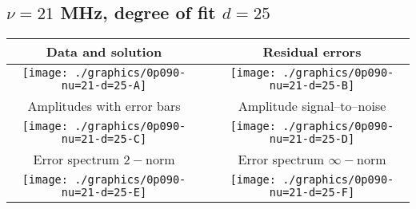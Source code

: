 

% 

\clearpage{}
\break{}

\subsection{$\nu = 21$ MHz, degree of fit $d = 25$}

\begin{table}[h]
    \begin{center}
        \begin{tabular}{ccc}
            Data and solution & \quad & Residual errors \\\hline
            \texttt{[image: ./graphics/0p090-nu=21-d=25-A]} &&
            \texttt{[image: ./graphics/0p090-nu=21-d=25-B]} \\[15pt]
            Amplitudes with error bars && Amplitude signal--to--noise \\\hline
            \texttt{[image: ./graphics/0p090-nu=21-d=25-C]} &&
            \texttt{[image: ./graphics/0p090-nu=21-d=25-D]} \\[15pt]
            Error spectrum $2-$norm && Error spectrum $\infty-$norm \\\hline
            \texttt{[image: ./graphics/0p090-nu=21-d=25-E]} &&
            \texttt{[image: ./graphics/0p090-nu=21-d=25-F]} \\[15pt]
        \end{tabular}
    \end{center}
\label{fig:elev=90, nu=21}
\end{table}



\endinput
